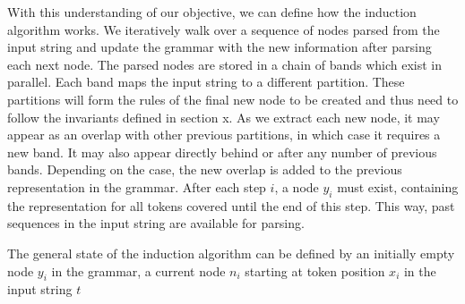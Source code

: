With this understanding of our objective, we can define how the induction algorithm works. We iteratively walk over a sequence of nodes parsed from the input string and update the grammar with the new information after parsing each next node. The parsed nodes are stored in a chain of bands which exist in parallel. Each band maps the input string to a different partition. These partitions will form the rules of the final new node to be created and thus need to follow the invariants defined in section x. As we extract each new node, it may appear as an overlap with other previous partitions, in which case it requires a new band. It may also appear directly behind or after any number of previous bands. Depending on the case, the new overlap is added to the previous representation in the grammar. After each step $i$, a node $y_i$ must exist, containing the representation for all tokens covered until the end of this step. This way, past sequences in the input string are available for parsing.

The general state of the induction algorithm can be defined by an initially empty node $y_i$ in the grammar, a current node $n_i$ starting at token position $x_i$ in the input string $t$ 

